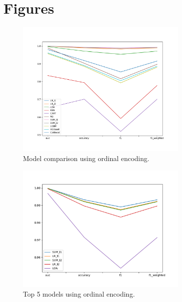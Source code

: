 \documentclass[11pt]{article}
\begin{document}
\section{Figures}

\begin{figure}[H]
    \centering
    \includegraphics[width=0.75\textwidth]{ordinal/model_compare.pdf}
    \caption{Model comparison using ordinal encoding.}
    \label{fig:ordinal_model_compare}
\end{figure}


\begin{figure}[H]
    \centering
    \includegraphics[width=0.75\textwidth]{ordinal/top5_model_compare.pdf}
    \caption{Top 5 models using ordinal encoding.}
    \label{fig:ordinal_top5_compare}
\end{figure}
\end{document}
